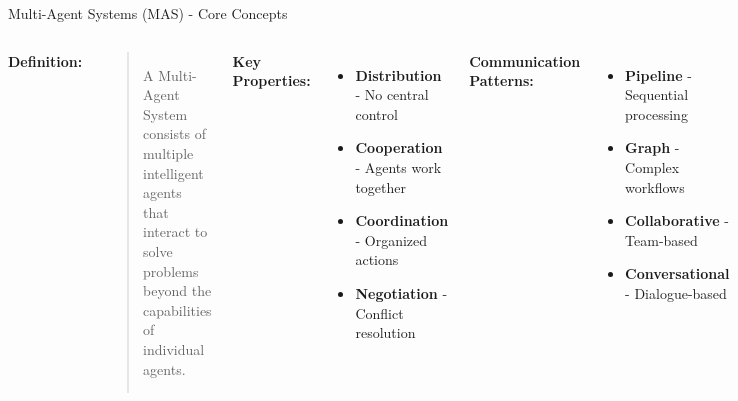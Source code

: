 \documentclass[aspectratio=169,11pt]{beamer}
\begin{document}
\begin{frame}{Multi-Agent Systems (MAS) - Core Concepts}
\begin{columns}
\textbf{Definition:}
\begin{quote}
A Multi-Agent System consists of multiple intelligent agents that interact to solve problems beyond the capabilities of individual agents.
\end{quote}

\textbf{Key Properties:}
\begin{itemize}
    \item \textbf{Distribution} - No central control
    \item \textbf{Cooperation} - Agents work together
    \item \textbf{Coordination} - Organized actions
    \item \textbf{Negotiation} - Conflict resolution
\end{itemize}

\textbf{Communication Patterns:}
\begin{itemize}
    \item {} \textbf{Pipeline} - Sequential processing
    \item {} \textbf{Graph} - Complex workflows
    \item {} \textbf{Collaborative} - Team-based
    \item {} \textbf{Conversational} - Dialogue-based
\end{itemize}

\vspace{0.3cm}
\textbf{Coordination Strategies:}
\begin{itemize}
    \item Centralized orchestration
    \item Peer-to-peer communication
    \item Blackboard systems
    \item Market-based coordination
\end{itemize}
\end{columns}
\end{frame}
\end{document}
